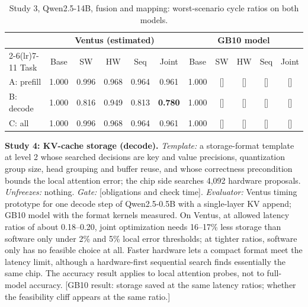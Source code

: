 \documentclass[11pt]{article}
\newcommand{\pending}[1]{\textcolor{red!65!black}{[#1]}}
\begin{document}
\begin{table}[tb]
\small
\centering
\begin{tabular}{@{}l ccccc ccccc@{}}
\toprule
 & \multicolumn{5}{c}{Ventus (estimated)} & \multicolumn{5}{c}{GB10 model} \\
\cmidrule(lr){2-6}\cmidrule(lr){7-11}
Task & Base & SW & HW & Seq & Joint & Base & SW & HW & Seq & Joint \\
\midrule
A: prefill & 1.000 & 0.996 & 0.968 & 0.964 & 0.961 & 1.000 & \pending{} & \pending{} & \pending{} & \pending{} \\
B: decode & 1.000 & 0.816 & 0.949 & 0.813 & \textbf{0.780} & 1.000 & \pending{} & \pending{} & \pending{} & \pending{} \\
C: all & 1.000 & 0.996 & 0.968 & 0.964 & 0.961 & 1.000 & \pending{} & \pending{} & \pending{} & \pending{} \\
\bottomrule
\end{tabular}
\caption{Study 3, Qwen2.5-14B, fusion and mapping: worst-scenario cycle ratios on both models.}
\label{tab:study3}
\end{table}

\textbf{Study 4: KV-cache storage (decode).} \emph{Template:} a storage-format template at level 2 whose searched decisions are key and value precisions, quantization group size, head grouping and buffer reuse, and whose correctness precondition bounds the local attention error; the chip side searches 4,092 hardware proposals. \emph{Unfreezes:} nothing. \emph{Gate:} \pending{obligations and check time}. \emph{Evaluator:} Ventus timing prototype for one decode step of Qwen2.5-0.5B with a single-layer KV append; GB10 model with the format kernels measured. On Ventus, at allowed latency ratios of about 0.18--0.20, joint optimization needs 16--17\% less storage than software only under 2\% and 5\% local error thresholds; at tighter ratios, software only has no feasible choice at all. Faster hardware lets a compact format meet the latency limit, although a hardware-first sequential search finds essentially the same chip. The accuracy result applies to local attention probes, not to full-model accuracy. \pending{GB10 result: storage saved at the same latency ratios; whether the feasibility cliff appears at the same ratio.}
\end{document}
